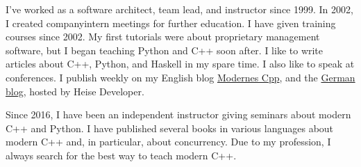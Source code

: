 I’ve worked as a software architect, team lead, and instructor since 1999. In 2002, I created companyintern meetings for further education. I have given training courses since 2002. My first tutorials were about proprietary management software, but I began teaching Python and C++ soon after. I like to write articles about C++, Python, and Haskell in my spare time. I also like to speak at conferences. I publish weekly on my English blog \href{https://www.modernescpp.com/}{Modernes Cpp}, and the \href{https://www.grimm-jaud.de/index.php/blog}{German blog}, hosted by Heise Developer.

Since 2016, I have been an independent instructor giving seminars about modern C++ and Python.
I have published several books in various languages about modern C++ and, in particular, about concurrency. Due to my profession, I always search for the best way to teach modern C++.

